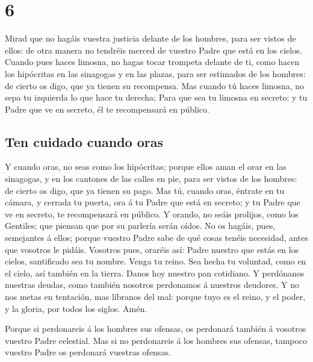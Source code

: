 \hypertarget{section-5}{%
\section{6}\label{section-5}}

 Mirad que no hagáis vuestra justicia delante de los
hombres, para ser vistos de ellos: de otra manera no tendréis merced de
vuestro Padre que está en los cielos.  Cuando pues haces
limosna, no hagas tocar trompeta delante de ti, como hacen los
hipócritas en las sinagogas y en las plazas, para ser estimados de los
hombres: de cierto os digo, que ya tienen su recompensa. 
Mas cuando tú haces limosna, no sepa tu izquierda lo que hace tu
derecha;  Para que sea tu limosna en secreto: y tu Padre
que ve en secreto, él te recompensará en público.

\hypertarget{ten-cuidado-cuando-oras}{%
\subsection{Ten cuidado cuando oras}\label{ten-cuidado-cuando-oras}}

 Y cuando oras, no seas como los hipócritas; porque ellos
aman el orar en las sinagogas, y en los cantones de las calles en pie,
para ser vistos de los hombres: de cierto os digo, que ya tienen su
pago.  Mas tú, cuando oras, éntrate en tu cámara, y
cerrada tu puerta, ora á tu Padre que está en secreto; y tu Padre que ve
en secreto, te recompensará en público.  Y orando, no
seáis prolijos, como los Gentiles; que piensan que por su parlería serán
oídos.  No os hagáis, pues, semejantes á ellos; porque
vuestro Padre sabe de qué cosas tenéis necesidad, antes que vosotros le
pidáis.  Vosotros pues, oraréis así: Padre nuestro que
estás en los cielos, santificado sea tu nombre.  Venga tu
reino. Sea hecha tu voluntad, como en el cielo, así también en la
tierra.  Danos hoy nuestro pan cotidiano. 
Y perdónanos nuestras deudas, como también nosotros perdonamos á
nuestros deudores.  Y no nos metas en tentación, mas
líbranos del mal: porque tuyo es el reino, y el poder, y la gloria, por
todos los siglos. Amén.

 Porque si perdonareis á los hombres sus ofensas, os
perdonará también á vosotros vuestro Padre celestial. 
Mas si no perdonareis á los hombres sus ofensas, tampoco vuestro Padre
os perdonará vuestras ofensas.

